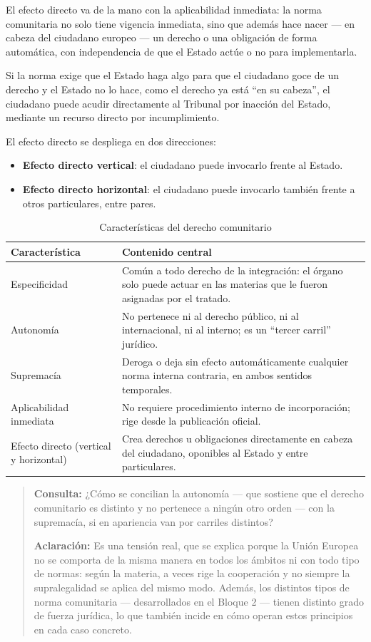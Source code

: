 \documentclass[12pt,oneside]{book}
\begin{document}
El efecto directo va de la mano con la aplicabilidad inmediata: la norma comunitaria no solo tiene vigencia inmediata, sino que además hace nacer --- en cabeza del ciudadano europeo --- un derecho o una obligación de forma automática, con independencia de que el Estado actúe o no para implementarla.

Si la norma exige que el Estado haga algo para que el ciudadano goce de un derecho y el Estado no lo hace, como el derecho ya está ``en su cabeza'', el ciudadano puede acudir directamente al Tribunal por inacción del Estado, mediante un recurso directo por incumplimiento.

El efecto directo se despliega en dos direcciones:
\begin{itemize}
    \item \textbf{Efecto directo vertical}: el ciudadano puede invocarlo frente al Estado.
    \item \textbf{Efecto directo horizontal}: el ciudadano puede invocarlo también frente a otros particulares, entre pares.
\end{itemize}

\begin{table}[H]
\centering
\caption{Características del derecho comunitario}
\begin{tabularx}{\textwidth}{@{} l X @{}}
\toprule
\textbf{Característica} & \textbf{Contenido central} \\
\midrule
Especificidad & Común a todo derecho de la integración: el órgano solo puede actuar en las materias que le fueron asignadas por el tratado. \\
Autonomía & No pertenece ni al derecho público, ni al internacional, ni al interno; es un ``tercer carril'' jurídico. \\
Supremacía & Deroga o deja sin efecto automáticamente cualquier norma interna contraria, en ambos sentidos temporales. \\
Aplicabilidad inmediata & No requiere procedimiento interno de incorporación; rige desde la publicación oficial. \\
Efecto directo (vertical y horizontal) & Crea derechos u obligaciones directamente en cabeza del ciudadano, oponibles al Estado y entre particulares. \\
\bottomrule
\end{tabularx}
\end{table}

\begin{quote}
\small
\textbf{Consulta:} ¿Cómo se concilian la autonomía --- que sostiene que el derecho comunitario es distinto y no pertenece a ningún otro orden --- con la supremacía, si en apariencia van por carriles distintos?

\textbf{Aclaración:} Es una tensión real, que se explica porque la Unión Europea no se comporta de la misma manera en todos los ámbitos ni con todo tipo de normas: según la materia, a veces rige la cooperación y no siempre la supralegalidad se aplica del mismo modo. Además, los distintos tipos de norma comunitaria --- desarrollados en el Bloque 2 --- tienen distinto grado de fuerza jurídica, lo que también incide en cómo operan estos principios en cada caso concreto.
\end{quote}
\end{document}
